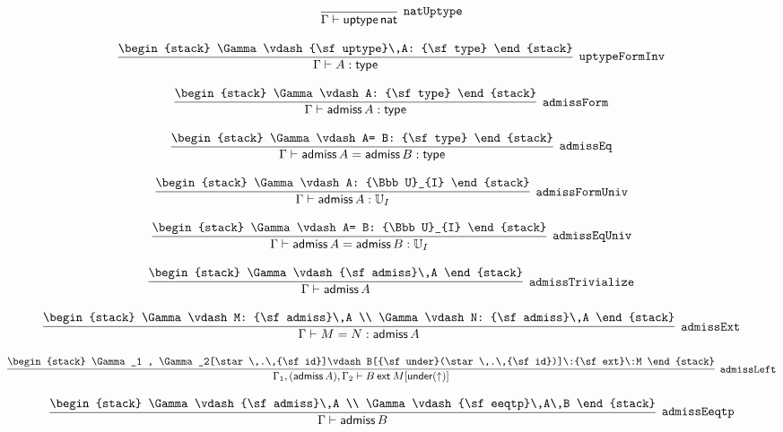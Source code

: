 \[
\infer[{\tt natUptype}]{\Gamma \vdash {\sf uptype}\,{\sf nat}}{}
\]

\[
\infer[{\tt uptypeFormInv}]{\Gamma \vdash A: {\sf type}}{
\begin{stack}
\Gamma \vdash {\sf uptype}\,A: {\sf type}
\end{stack}}
\]

\[
\infer[{\tt admissForm}]{\Gamma \vdash {\sf admiss}\,A: {\sf type}}{
\begin{stack}
\Gamma \vdash A: {\sf type}
\end{stack}}
\]

\[
\infer[{\tt admissEq}]{\Gamma \vdash {\sf admiss}\,A= {\sf admiss}\,B: {\sf type}}{
\begin{stack}
\Gamma \vdash A= B: {\sf type}
\end{stack}}
\]

\[
\infer[{\tt admissFormUniv}]{\Gamma \vdash {\sf admiss}\,A: {\Bbb U}_{I}}{
\begin{stack}
\Gamma \vdash A: {\Bbb U}_{I}
\end{stack}}
\]

\[
\infer[{\tt admissEqUniv}]{\Gamma \vdash {\sf admiss}\,A= {\sf admiss}\,B: {\Bbb U}_{I}}{
\begin{stack}
\Gamma \vdash A= B: {\Bbb U}_{I}
\end{stack}}
\]

\[
\infer[{\tt admissTrivialize}]{\Gamma \vdash {\sf admiss}\,A}{
\begin{stack}
\Gamma \vdash {\sf admiss}\,A
\end{stack}}
\]

\[
\infer[{\tt admissExt}]{\Gamma \vdash M= N: {\sf admiss}\,A}{
\begin{stack}
\Gamma \vdash M: {\sf admiss}\,A
\\
\Gamma \vdash N: {\sf admiss}\,A
\end{stack}}
\]

\[
\infer[{\tt admissLeft}]{\Gamma_1 ,({\sf admiss}\,A), \Gamma_2 \vdash B\:{\sf ext}\:M[{\sf under}(\uparrow )]}{
\begin{stack}
\Gamma_1 , \Gamma_2[\star \,.\,{\sf id}]\vdash B[{\sf under}(\star \,.\,{\sf id})]\:{\sf ext}\:M
\end{stack}}
\]

\[
\infer[{\tt admissEeqtp}]{\Gamma \vdash {\sf admiss}\,B}{
\begin{stack}
\Gamma \vdash {\sf admiss}\,A
\\
\Gamma \vdash {\sf eeqtp}\,A\,B
\end{stack}}
\]

